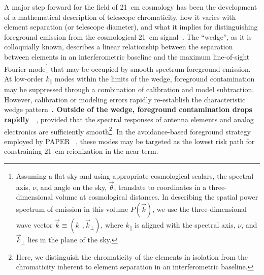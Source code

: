 \documentclass[twocolumn]{emulateapj}
\begin{document}
    A major step forward for the field of 21~cm cosmology has been the development
    of a mathematical description of telescope chromaticity, how it varies with
    element separation (or telescope diameter), and what it implies for distinguishing
    foreground emission from the cosmological 21~cm signal~\textbf{\citep{Parsons_et_al_2012, vedantham_et_al2012, trott_et_al2012, 2014PhRvD..90b3018L, 2014PhRvD..90b3019L, 2015PhRvD..91b3002D,nithya_et_al2013,  Thyagarajan_et_al2015}.}  The ``wedge'', as it is
    colloquially known, describes a linear relationship between the separation between elements
    in an interferometric baseline and the maximum line-of-sight Fourier mode\footnote{Assuming
    a flat sky and using appropriate
    cosmological scalars,
    the spectral axis, $\nu$, and angle on the sky, $\vec\theta$, translate to coordinates in
    a three-dimensional volume at cosmological distances.  In describing the spatial power spectrum of
    emission in this volume $P(\vec k)$, we use the three-dimensional wave vector 
    $\vec k\equiv(k_\parallel,\vec k_\perp)$, where $k_\parallel$ is aligned with the
    spectral axis, $\nu$, and $\vec k_\perp$ lies in the plane of the sky.}
    that may be occupied by smooth spectrum foreground emission.  At low-order $k_\parallel$ modes
    within the limits of the wedge,
    foreground contamination may be suppressed through a combination of calibration and model 
    subtraction.  However, calibration or modeling errors rapidly re-establish the characteristic
    wedge pattern~\textbf{\citep{2016MNRAS.461.3135B}.  Outside of the wedge, foreground contamination drops rapidly 
    ~\citep{pober_et_al2013, 2014PhRvD..89b3002D,  Thyagarajan_et_al2015, Saul_et_al2016}}, provided that the spectral responses
    of antenna elements and analog electronics are sufficiently smooth\footnote{Here, we distinguish
    the chromaticity of the elements in isolation from the chromaticity inherent to
    element separation in an interferometric baseline.}.  In the avoidance-based
    foreground strategy employed by PAPER ~\citep{parsons_et_al2014, Ali_et_al2015}, these modes
    may be targeted as the lowest risk path for constraining 21~cm reionization in the near term.
      
\end{document}
